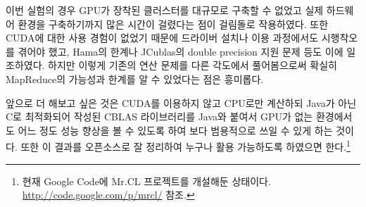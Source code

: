 \documentclass[a4paper]{article}
\begin{document}
\begin{multicols}{2}
이번 실험의 경우 GPU가 장착된 클러스터를 대규모로 구축할 수 없었고 실제 하드웨어 환경을 구축하기까지 많은 시간이 걸렸다는 점이 걸림돌로 작용하였다.
또한 CUDA에 대한 사용 경험이 없었기 때문에 드라이버 설치나 이용 과정에서도 시행착오를 겪어야 했고, Hama의 한계나 JCublas의 double precision 지원 문제 등도 이에 일조하였다.
하지만 이렇게 기존의 연산 문제를 다른 각도에서 풀어봄으로써 확실히 MapReduce의 가능성과 한계를 알 수 있었다는 점은 흥미롭다.

앞으로 더 해보고 싶은 것은 CUDA를 이용하지 않고 CPU로만 계산하되 Java가 아닌 C로 최적화되어 작성된 CBLAS 라이브러리를 Java와 붙여서 GPU가 없는 환경에서도 어느 정도 성능 향상을 볼 수 있도록 하여 보다 범용적으로 쓰일 수 있게 하는 것이다.
또한 이 결과를 오픈소스로 잘 정리하여 누구나 활용 가능하도록 하였으면 한다.\footnote{현재 Google Code에 Mr.CL 프로젝트를 개설해둔 상태이다. \url{http://code.google.com/p/mrcl/} 참조.}

\end{multicols}
\end{document}
